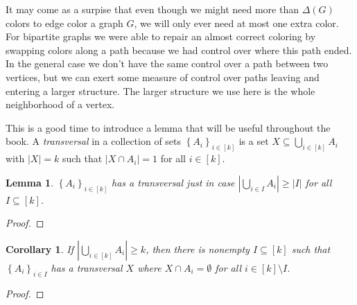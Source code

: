 \documentclass{tufte-book} %
\theoremstyle{plain}
\newtheorem{corollary}{Corollary}
\newtheorem{lemma}{Lemma}
\newcommand{\set}[1]{\left\{ #1 \right\}}
\newcommand{\card}[1]{\left|#1\right|}
\newcommand{\irange}[1]{\left[#1\right]}
\begin{document}
It may come as a surpise that even though we might need more than $\Delta(G)$ colors to edge color a graph $G$, we will only ever need at most one extra color.
For bipartite graphs we were able to repair an almost correct coloring by swapping colors along a path because we had control over where this path ended.  In the
general case we don't have the same control over a path between two vertices, but we can exert some measure of control over paths leaving and entering a larger structure. 
The larger structure we use here is the whole neighborhood of a vertex.

This is a good time to introduce a lemma that will be useful throughout the book.  
A \emph{transversal} in a collection of sets $\set{A_i}_{i \in \irange{k}}$ is a set $X \subseteq \bigcup_{i \in \irange{k}} A_i$ with $\card{X} = k$ such that $\card{X \cap A_i} = 1$
for all $i \in \irange{k}$.
\begin{lemma}
$\set{A_i}_{i \in \irange{k}}$ has a transversal just in case $\card{\bigcup_{i \in I} A_i} \ge \card{I}$ for all $I \subseteq \irange{k}$.
\end{lemma}
\begin{proof}
\end{proof}

\begin{corollary}\label{TransversalCorollary}
If $\card{\bigcup_{i \in \irange{k}} A_i} \ge k$, then there is nonempty $I \subseteq \irange{k}$ such that $\set{A_i}_{i \in I}$ has a transversal $X$ where $X \cap A_i = \emptyset$
for all $i \in \irange{k} \setminus I$.
\end{corollary}
\begin{proof}
\end{proof}
\end{document}
